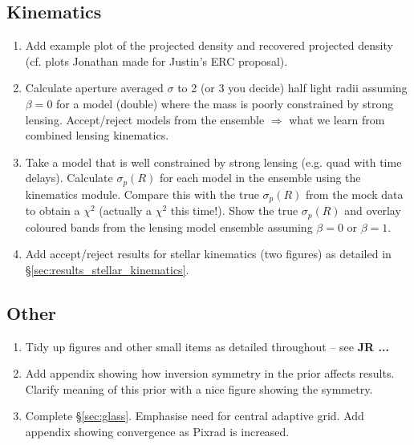 \documentclass[galley,usenatbib]{mn2e}
\begin{document}
\subsection{Kinematics}

\begin{enumerate}

\item Add example plot of the projected density and recovered
  projected density (cf. plots Jonathan made for Justin's ERC
  proposal).

\item Calculate aperture averaged $\sigma$ to 2 (or 3 you decide) half
  light radii assuming $\beta = 0$ for a model (double) where the mass
  is poorly constrained by strong lensing. Accept/reject models from
  the ensemble $\Longrightarrow$ what we learn from combined lensing
  kinematics.

\item Take a model that is well constrained by strong lensing
  (e.g. quad with time delays). Calculate $\sigma_p(R)$ for each model
  in the ensemble using the kinematics module. Compare this with the
  true $\sigma_p(R)$ from the mock data to obtain a $\chi^2$ (actually
  a $\chi^2$ this time!).  Show the true $\sigma_p(R)$ and overlay
  coloured bands from the lensing model ensemble assuming $\beta = 0$
  or $\beta = 1$.

\item Add accept/reject results for stellar kinematics (two figures)
  as detailed in \S\ref{sec:results_stellar_kinematics}.

\end{enumerate}

\subsection{Other}

\begin{enumerate}

\item Tidy up figures and other small items as detailed throughout --
  see {\bf JR ... }

\item Add appendix showing how inversion symmetry in the prior affects
  results. Clarify meaning of this prior with a nice figure showing
  the symmetry.

\item Complete \S\ref{sec:glass}. Emphasise need for central adaptive
  grid. Add appendix showing convergence as Pixrad is increased.

\end{enumerate}
\end{document}
